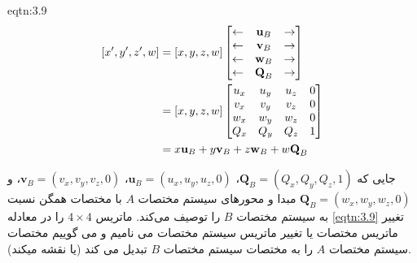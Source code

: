 {\begin{spacing}{1.5}
        \begin{eqtn}{eqtn:3.9}
            \begin{equation*}
                \centering
                \begin{split}
                [x^\prime,y^\prime,z^\prime,w]
                    &=[x,y,z,w]\begin{bmatrix}
                                   \leftarrow & \textbf{u}_{B} & \rightarrow \\
                                   \leftarrow & \textbf{v}_{B} & \rightarrow \\
                                   \leftarrow & \textbf{w}_{B} & \rightarrow \\
                                   \leftarrow & \textbf{Q}_{B} & \rightarrow
                    \end{bmatrix} \\
                    &=[x,y,z,w]\begin{bmatrix}
                                   u_{x} & u_{y} & u_{z} & 0 \\
                                   v_{x} & v_{y} & v_{z} & 0 \\
                                   w_{x} & w_{y} & w_{z} & 0 \\
                                   Q_{x} & Q_{y} & Q_{z} & 1
                    \end{bmatrix} \\
                    &=x\textbf{u}_{B}+y\textbf{v}_{B}+z\textbf{w}_{B}+w\textbf{Q}_{B}
                \end{split}
            \end{equation*}
            \centering
        \end{eqtn}

        جایی که $\textbf{Q}_{B}=(Q_{x}, Q_{y}, Q_{z}, 1)$، $\textbf{u}_{B}=(u_{x}, u_{y}, u_{z}, 0)$، $\textbf{v}_{B}=(v_{x}, v_{y}, v_{z}, 0)$، و $\textbf{Q}_{B}=(w_{x}, w_{y}, w_{z}, 0)$ مبدا و محورهای سیستم مختصات $A$ با مختصات همگن نسبت به سیستم مختصات $B$ را توصیف می‌کند.
        ماتریس $4\times 4$ را در معادله \ref{eqtn:3.9} تغییر ماتریس مختصات یا تغییر ماتریس سیستم مختصات می نامیم و می گوییم مختصات سیستم مختصات $A$ را به مختصات سیستم مختصات $B$ تبدیل می کند (یا نقشه میکند).
    \end{spacing}
}

